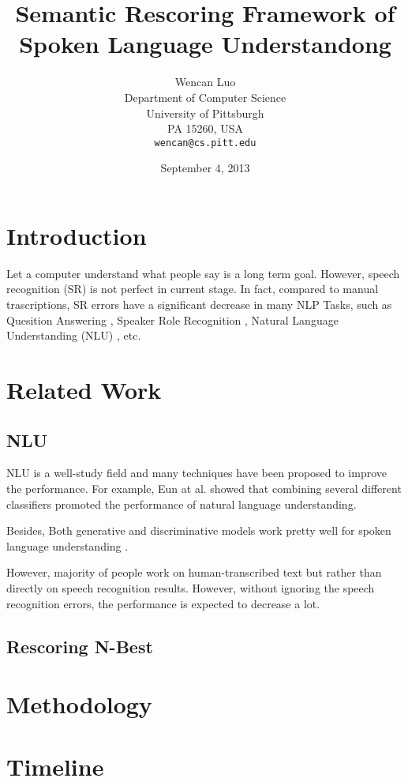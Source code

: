 \documentclass[11pt,letterpaper]{article}
\title{Semantic Rescoring Framework of Spoken Language Understandong}
\author{Wencan Luo\\
	    Department of Computer Science\\
	    University of Pittsburgh\\
	    PA 15260, USA\\
	    {\tt wencan@cs.pitt.edu}
	  }
\date{September 4, 2013}
\begin{document}
\maketitle
\begin{abstract}
  
\end{abstract}

\section{Introduction}
Let a computer understand what people say is a long term goal. However, speech recognition (SR) is not perfect in current stage. 
In fact, compared to manual trascriptions, SR errors have a significant decrease in many NLP Tasks, such as Quesition Answering \cite{Turmo:2007}, Speaker Role Recognition \cite{Garg:2008}, Natural Language Understanding (NLU) \cite{Raymond:2007}, etc.

\section{Related Work}
\subsection{NLU}

NLU is a well-study field and many techniques have been proposed to improve the performance. For example, Eun at al. showed that combining several different classifiers promoted the performance of natural language understanding. 
 
Besides, Both generative and discriminative models work pretty well for spoken language understanding \cite{Raymond:2007}.
 
However, majority of people work on human-transcribed text but rather than directly on speech recognition results. However, without ignoring the speech recognition errors, the performance is expected to decrease a lot. 

\subsection{Rescoring N-Best}

\section{Methodology}

\section{Timeline}
\end{document}
